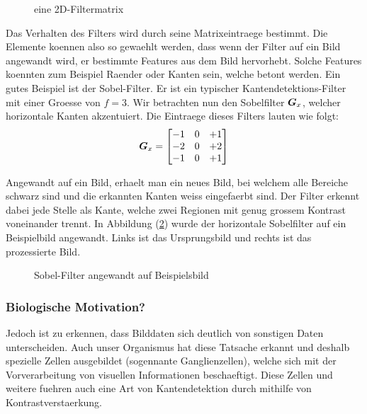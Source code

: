 \begin{figure}[h!]
  \caption{eine 2D-Filtermatrix}
  \label{fig:filtermatrix}
\end{figure}
\para{}
Das Verhalten des Filters wird durch seine Matrixeintraege bestimmt.
Die Elemente koennen also so gewaehlt werden, dass wenn der Filter auf ein Bild
angewandt wird, er bestimmte Features aus dem Bild hervorhebt. Solche Features
koennten zum Beispiel Raender oder Kanten sein, welche betont werden.
\para{}
Ein gutes Beispiel ist der Sobel-Filter. Er ist ein typischer Kantendetektions-Filter mit einer
Groesse von $f = 3$. Wir betrachten nun den Sobelfilter $\bm{G}_x$, welcher
horizontale Kanten akzentuiert. Die Eintraege dieses Filters lauten wie folgt:
\begin{equation*}
  \bm{G}_x =
  \begin{bmatrix}
    -1 & 0 & +1 \\
    -2 & 0 & +2 \\
    -1 & 0 & +1 \\
  \end{bmatrix}
\end{equation*}

Angewandt auf ein Bild, erhaelt man ein neues Bild, bei welchem alle Bereiche
schwarz sind und die erkannten Kanten weiss eingefaerbt sind. Der Filter erkennt
dabei jede Stelle als Kante, welche zwei Regionen mit genug grossem Kontrast
voneinander trennt.
In Abbildung (\ref{fig:sobel_filter}) wurde der horizontale Sobelfilter auf ein
Beispielbild angewandt. Links ist das Ursprungsbild und rechts ist das
prozessierte Bild.


\begin{figure}[h!]

  \caption{Sobel-Filter angewandt auf Beispielsbild}
  \label{fig:sobel_filter}
\end{figure}

\para{}
\cite{wiki:sobel_operator}
\cite{deeplearning.ai:cnn}
\cite{wiki:kernel}

\subsubsection{Biologische Motivation?}
Jedoch ist zu erkennen, dass Bilddaten sich deutlich von sonstigen Daten unterscheiden.
Auch unser Organismus hat diese Tatsache erkannt und deshalb spezielle Zellen
ausgebildet (sogennante Ganglienzellen), welche sich mit der Vorverarbeitung von
visuellen Informationen beschaeftigt. Diese Zellen und weitere fuehren auch eine
Art von Kantendetektion durch mithilfe von Kontrastverstaerkung.

